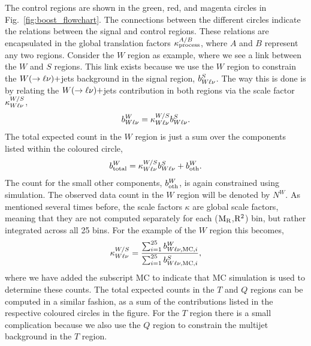 The control regions are shown in the green, red, and magenta circles in
Fig.~\ref{fig:boost_flowchart}. The connections between the different circles indicate the
relations between the signal and control regions. These relations are encapsulated in the global
translation factors $\kappa^{A/B}_{\rm process}$, where $A$ and $B$ represent any two regions. 
Consider the $W$ region as example, where we see a link between the $W$ and $S$ regions. This link
exists because we use the $W$ region to constrain the $W(\rightarrow \ell\nu)+$jets background in
the signal region, $b^S_{W\ell\nu}$. The way this is done is by relating the $W(\rightarrow
\ell\nu)+$jets contribution in both regions via the scale factor $\kappa^{W/S}_{W\ell\nu}$, 
\begin{equation}
  b^W_{W\ell\nu} = \kappa^{W/S}_{W\ell\nu} b^S_{W\ell\nu}  .
\end{equation}
The total expected count in the $W$ region is just a sum over the components listed within the
coloured circle, 
\begin{equation}
  b^W_{\rm total} = \kappa^{W/S}_{W\ell\nu} b^S_{W\ell\nu}  + b_{\rm oth}^W .
\end{equation}
The count for the small other components, $b_{\rm oth}^W$, is again constrained using simulation.
The observed data count in the $W$ region will be denoted by $N^W$. 
As mentioned several times before, the scale factors $\kappa$ are global scale factors, meaning that
they are not computed separately for each ($\mathrm{M_R}$,$\mathrm{R^2}$) bin, but rather integrated across all 25
bins. For the example of the $W$ region this becomes,
\begin{equation}
  \kappa^{W/S}_{W\ell\nu} = \frac{ \sum_{i=1}^{25} b^W_{W\ell\nu, {\rm MC}, i}} {
\sum_{i=1}^{25} b^S_{W\ell\nu, {\rm MC}, i}} ,
\label{eq:kappa_example}
\end{equation}
where we have added the subscript MC to indicate that MC simulation is used to determine these
counts. 
The total expected counts in the $T$ and $Q$ regions can be computed in a similar fashion, as a sum
of the contributions listed in the respective coloured circles in the figure. For the $T$ region
there is a small complication because we also use the $Q$ region to constrain the multijet
background in the $T$ region. 

